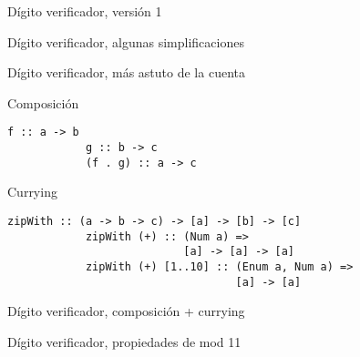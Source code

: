 \documentclass[12pt]{beamer}
\begin{document}
\begin{frame}[fragile]
    \begin{block}{Dígito verificador, versión 1}
        
    \end{block}
\end{frame}

\begin{frame}[fragile]
    \begin{block}{Dígito verificador, algunas simplificaciones}
        
    \end{block}
\end{frame}

\begin{frame}[fragile]
    \begin{block}{Dígito verificador, más astuto de la cuenta}
        
    \end{block}
\end{frame}

\begin{frame}[fragile]
    \begin{block}{Composición}
        \begin{lstlisting}[style=hs,gobble=12,escapechar=\&]
            f :: a -> b
            g :: b -> c
            (f . g) :: a -> c
        \end{lstlisting}
    \end{block}
    \pause
    \begin{block}{Currying}
        \begin{lstlisting}[style=hs,gobble=12,escapechar=\&]
            zipWith :: (a -> b -> c) -> [a] -> [b] -> [c]
            zipWith (+) :: (Num a) =>
                           [a] -> [a] -> [a]
            zipWith (+) [1..10] :: (Enum a, Num a) =>
                                   [a] -> [a]
        \end{lstlisting}
    \end{block}
\end{frame}

\begin{frame}[fragile]
    \begin{block}{Dígito verificador, composición + currying}
        
    \end{block}
\end{frame}

\begin{frame}[fragile]
    \begin{block}{Dígito verificador, propiedades de mod 11}
        
    \end{block}
\end{frame}
\end{document}
